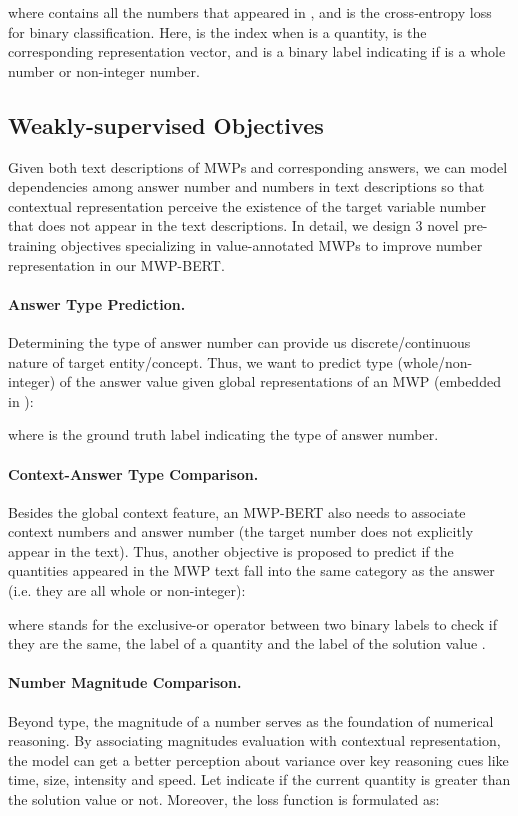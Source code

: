 \documentclass[11pt]{article}
\begin{document}
where  contains all the numbers that appeared in , and  is the cross-entropy loss for binary classification. Here,  is the index when  is a quantity,  is the corresponding representation vector, and  is a binary label indicating if  is a whole number or non-integer number.

\subsection{Weakly-supervised Objectives}
Given both text descriptions of MWPs and corresponding answers, we can model dependencies among answer number and numbers in text descriptions so that contextual representation perceive the existence of the target variable number that does not appear in the text descriptions. In detail, we design 3 novel pre-training objectives specializing in value-annotated MWPs to improve number representation in our MWP-BERT. 

\paragraph{Answer Type Prediction.} Determining the type of answer number can provide us discrete/continuous nature of target entity/concept. Thus, we want to predict type (whole/non-integer) of the answer value given global representations of an MWP (embedded in ):

where  is the ground truth label indicating the type of answer number. 

\paragraph{Context-Answer Type Comparison.} Besides the global context feature, an MWP-BERT also needs to associate context numbers and answer number (the target number does not explicitly appear in the text). Thus, another objective is proposed to predict if the quantities appeared in the MWP text fall into the same category as the answer (i.e. they are all whole or non-integer):

where  stands for the exclusive-or operator between two binary labels to check if they are the same, the label of a quantity  and the label of the solution value . 

\paragraph{Number Magnitude Comparison.} Beyond type, the magnitude of a number serves as the foundation of numerical reasoning. By associating magnitudes evaluation with contextual representation, the model can get a better perception about variance over key reasoning cues like time, size, intensity and speed. Let  indicate if the current quantity  is greater than the solution value or not.   Moreover, the loss function is formulated as:
\end{document}
